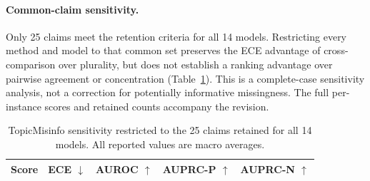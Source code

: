\begin{revision}


\paragraph{Common-claim sensitivity.}
Only 25 claims meet the retention criteria for all 14 models. Restricting every method and model to that common set preserves the ECE advantage of cross-comparison over plurality, but does not establish a ranking advantage over pairwise agreement or concentration (Table~\ref{tab:topic_common}). This is a complete-case sensitivity analysis, not a correction for potentially informative missingness. The full per-instance scores and retained counts accompany the revision.
\end{revision}

\begin{table}[t]
\centering\small\revisioncolor
\begin{tabular}{lrrrr}
\toprule
Score & ECE $\downarrow$ & AUROC $\uparrow$ & AUPRC-P $\uparrow$ & AUPRC-N $\uparrow$\\
\midrule

\bottomrule
\end{tabular}
\caption{TopicMisinfo sensitivity restricted to the 25 claims retained for all 14 models. All reported values are macro averages.}
\label{tab:topic_common}
\end{table}

